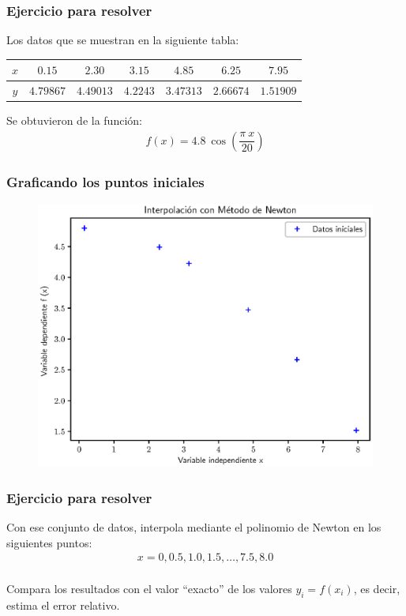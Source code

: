 \documentclass[12pt]{beamer}
\begin{document}
\begin{frame}
\frametitle{Ejercicio para resolver}
Los datos que se muestran en la siguiente tabla:
\pause
\begin{table}[H]
\small
\begin{tabular}{c | c | c | c | c | c | c}
$x$ & $0.15$ & $2.30$ & $3.15$ & $4.85$ & $6.25$ & $7.95$ \\ \hline
$y$ & $4.79867$ & $4.49013$ & $4.2243$ & $3.47313$ & $2.66674$ & $1.51909$
\end{tabular}
\end{table}
Se obtuvieron de la función:
\begin{align*}
f (x) = 4.8 \: \cos \left( \dfrac{\pi \: x}{20} \right)
\end{align*}
\end{frame}
\begin{frame}
\frametitle{Graficando los puntos iniciales}
\begin{figure}
    \centering
    \includegraphics[scale=0.58]{Imagenes/Ejercicio_Newton_01.eps}
\end{figure}
\end{frame}    
\begin{frame}
\frametitle{Ejercicio para resolver}
Con ese conjunto de datos, interpola mediante el polinomio de Newton en los siguientes puntos:
\pause
\begin{align*}
x = 0, 0.5, 1.0, 1.5, \ldots, 7.5, 8.0
\end{align*}
\\
\bigskip
Compara los resultados con el valor \enquote{exacto} de los valores $y_{i} = f(x_{i})$, es decir, estima el error relativo.
\end{frame}
\end{document}
